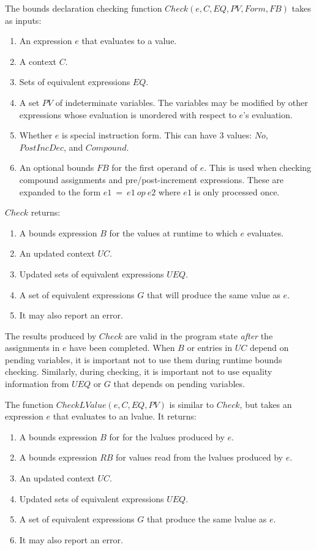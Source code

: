 The bounds declaration checking function $Check(e, C, EQ, PV, Form, FB)$ takes as inputs:
\begin{enumerate}
\item An expression $e$ that evaluates to a value.
\item A context $C$.
\item Sets of equivalent expressions $EQ$.
\item A set $PV$ of indeterminate variables.  The variables 
may be modified by other expressions whose  evaluation is unordered with respect to $e$'s evaluation.
\item Whether $e$ is special instruction form.  This can have 3 values: $No$, $PostIncDec$,
and $Compound$.
\item An optional bounds $FB$ for the first operand of $e$.  
This is used when checking compound assignments and pre/post-increment expressions.  These are
expanded to the form $e1~=~e1~op~e2$ where $e1$ is only processed once. 
\end{enumerate}

$Check$ returns:
\begin{enumerate}
\item A bounds expression $B$ for the values at runtime to which $e$ evaluates.
\item An updated context $\mathit{UC}$.
\item Updated sets of equivalent expressions $UEQ$.
\item A set of equivalent expressions $G$ that will produce the same value as $e$. 
\item It may also report an error.
\end{enumerate}
The results produced by $Check$ are valid in the program state
{\em after} the assignments in $e$ have been completed.   When $B$ or entries in 
$\mathit{UC}$ depend on pending variables, it is important not to use them during runtime bounds checking.
Similarly, during checking, it is important not to use equality information
from $UEQ$ or $G$ that depends on pending variables.

The function $CheckLValue(e, C, EQ, PV)$ is similar to $Check$, but takes an
expression $e$ that evaluates to an lvalue.  It returns:
\begin{enumerate}
\item A bounds expression $B$ for for the lvalues produced by $e$.
\item A bounds expression $RB$ for values read from the lvalues produced by $e$.
\item An updated context $\mathit{UC}$.
\item Updated sets of equivalent expressions $UEQ$.
\item A set of equivalent expressions $G$ that produce the same lvalue as $e$. 
\item It may also report an error.
\end{enumerate}

